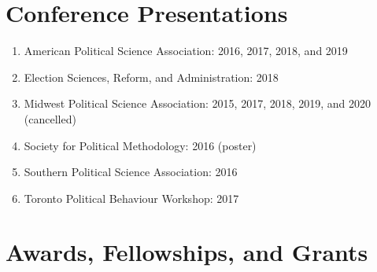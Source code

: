 \documentclass[12pt]{article}
\begin{document}
\section*{Conference Presentations}

\begin{enumerate}[topsep = 0pt, itemsep = 1ex, partopsep  = 1ex, parsep = 1ex]
	
	\item[] American Political Science Association: 2016, 2017, 2018, and 2019
	
	\item[] Election Sciences, Reform, and Administration: 2018 
	
	\item[] Midwest Political Science Association: 2015, 2017, 2018, 2019, and 2020 (cancelled)
	
	\item[] Society for Political Methodology: 2016 (poster)
	
	\item[] Southern Political Science Association: 2016
	
	\item[] Toronto Political Behaviour Workshop: 2017
	
\end{enumerate}

\section*{Awards, Fellowships, and Grants} 
\end{document}
